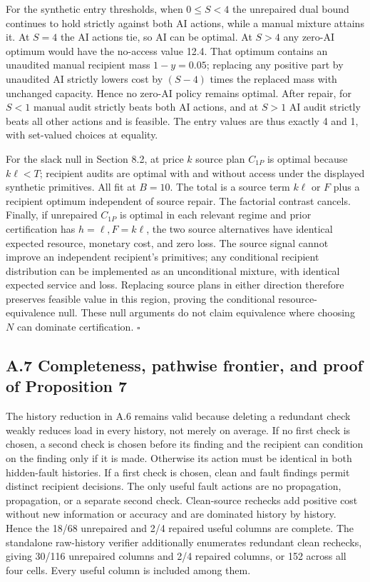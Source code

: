 \documentclass[
  11pt,
  a4paper,
]{article}
\begin{document}
For the synthetic entry thresholds, when \(0\leq S<4\) the unrepaired
dual bound continues to hold strictly against both AI actions, while a
manual mixture attains it. At \(S=4\) the AI actions tie, so AI can be
optimal. At \(S>4\) any zero-AI optimum would have the no-access value
12.4. That optimum contains an unaudited manual recipient mass
\(1-y=0.05\); replacing any positive part by unaudited AI strictly
lowers cost by \((S-4)\) times the replaced mass with unchanged
capacity. Hence no zero-AI policy remains optimal. After repair, for
\(S<1\) manual audit strictly beats both AI actions, and at \(S>1\) AI
audit strictly beats all other actions and is feasible. The entry values
are thus exactly 4 and 1, with set-valued choices at equality.

For the slack null in Section 8.2, at price \(k\) source plan \(C_{1P}\)
is optimal because \(k\ell<T\); recipient audits are optimal with and
without access under the displayed synthetic primitives. All fit at
\(B=10\). The total is a source term \(k\ell\) or \(F\) plus a recipient
optimum independent of source repair. The factorial contrast cancels.
Finally, if unrepaired \(C_{1P}\) is optimal in each relevant regime and
prior certification has \(h=\ell,F=k\ell\), the two source alternatives
have identical expected resource, monetary cost, and zero loss. The
source signal cannot improve an independent recipient's primitives; any
conditional recipient distribution can be implemented as an
unconditional mixture, with identical expected service and loss.
Replacing source plans in either direction therefore preserves feasible
value in this region, proving the conditional resource-equivalence null.
These null arguments do not claim equivalence where choosing \(N\) can
dominate certification. \(\square\)

\hypertarget{a.7-completeness-pathwise-frontier-and-proof-of-proposition-7}{%
\subsection{A.7 Completeness, pathwise frontier, and proof of
Proposition
7}\label{a.7-completeness-pathwise-frontier-and-proof-of-proposition-7}}

The history reduction in A.6 remains valid because deleting a redundant
check weakly reduces load in every history, not merely on average. If no
first check is chosen, a second check is chosen before its finding and
the recipient can condition on the finding only if it is made. Otherwise
its action must be identical in both hidden-fault histories. If a first
check is chosen, clean and fault findings permit distinct recipient
decisions. The only useful fault actions are no propagation,
propagation, or a separate second check. Clean-source rechecks add
positive cost without new information or accuracy and are dominated
history by history. Hence the 18/68 unrepaired and 2/4 repaired useful
columns are complete. The standalone raw-history verifier additionally
enumerates redundant clean rechecks, giving 30/116 unrepaired columns
and 2/4 repaired columns, or 152 across all four cells. Every useful
column is included among them.
\end{document}
